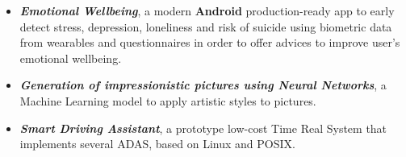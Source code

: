 \documentclass[10pt,a4paper,ragged2e,withhyper]{altacv}
\begin{document}
\begin{paracol}{2}
            
     
                
                
        \switchcolumn
        
            
        
            \divider\newline
            \divider\newline
            \divider\newline
        
    
    \end{paracol}

        \begin{itemize}
            \item \textit{\textbf{Emotional Wellbeing}}, a modern \textbf{Android} production-ready app to early detect stress, depression, loneliness and risk of suicide using biometric data from wearables and questionnaires in order to offer advices to improve user's emotional wellbeing. 
            \item \textit{\textbf{Generation of impressionistic pictures using Neural Networks}}, a Machine Learning model to apply artistic styles to pictures.
            \item \textit{\textbf{Smart Driving Assistant}}, a prototype low-cost Time Real System that implements several ADAS, based on Linux and POSIX.
        \end{itemize}
\end{document}
